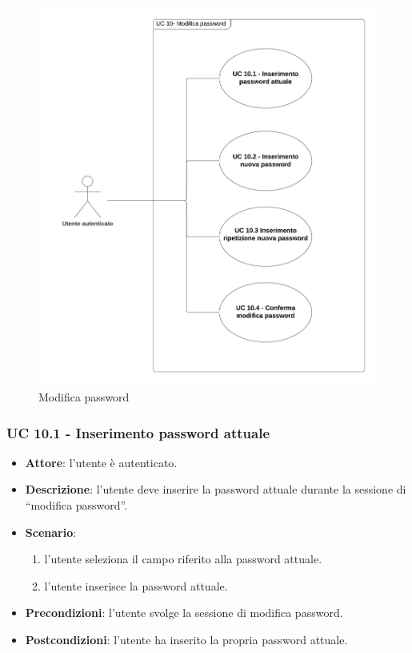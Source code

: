 \begin{figure}[!h]
    \includegraphics[width=15cm]{sezioni/Images/UC10_s.png}
    \centering
    \caption{Modifica password}
\end{figure}

\subsubsection{UC 10.1 - Inserimento password attuale} 
\begin{itemize}
    \item \textbf{Attore}: l'utente è autenticato.
    \item \textbf{Descrizione}: l'utente deve inserire la password attuale durante la sessione di “modifica password”.
    \item \textbf{Scenario}:
    \begin{enumerate}
        \item l'utente seleziona il campo riferito alla password attuale.
        \item l'utente inserisce la password attuale.
    \end{enumerate}

    \item \textbf{Precondizioni}: l'utente svolge la sessione di modifica password.
    \item \textbf{Postcondizioni}: l'utente ha inserito la propria password attuale.

\end{itemize}

